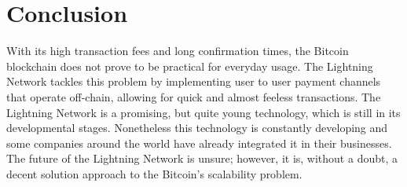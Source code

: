 \documentclass[a4paper, 12pt]{report}
\begin{document}
\chapter{Conclusion}

\par With its high transaction fees and long confirmation times, the Bitcoin blockchain does not prove to be practical for everyday usage. The Lightning Network tackles this problem by implementing user to user payment channels that operate off-chain, allowing for quick and almost feeless transactions. The Lightning Network is a promising, but quite young technology, which is still in its developmental stages. Nonetheless this technology is constantly developing and some companies around the world have already integrated it in their businesses. The future of the Lightning Network is unsure; however, it is, without a doubt, a decent solution approach to the Bitcoin’s scalability problem.

\printbibliography[
heading=bibintoc,
title={References}
]
\end{document}
